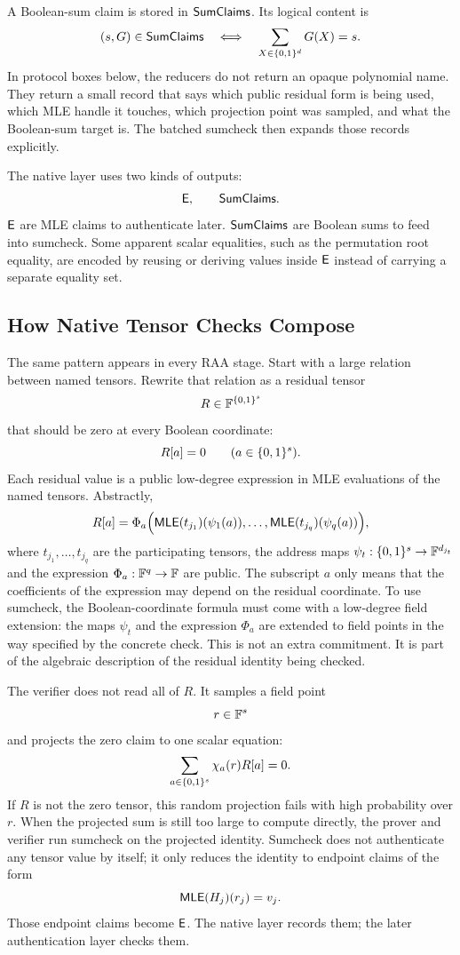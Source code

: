 A Boolean-sum claim is stored in \(\mathsf{SumClaims}\).  Its logical content is
\[
  (s,G)\in\mathsf{SumClaims}
  \quad\Longleftrightarrow\quad
  \sum_{X\in\{0,1\}^d}G(X)=s.
\]
In protocol boxes below, the reducers do not return an opaque polynomial name.
They return a small record that says which public residual form is being used,
which MLE handle it touches, which projection point was sampled, and what the
Boolean-sum target is.  The batched sumcheck then expands those records
explicitly.

The native layer uses two kinds of outputs:
\[
  \mathsf{E},\qquad \mathsf{SumClaims}.
\]
\(\mathsf{E}\) are MLE claims to authenticate later.  \(\mathsf{SumClaims}\) are
Boolean sums to feed into sumcheck.  Some apparent scalar equalities, such as
the permutation root equality, are encoded by reusing or deriving values inside
\(\mathsf{E}\) instead of carrying a separate equality set.

\subsection{How Native Tensor Checks Compose}

The same pattern appears in every RAA stage.  Start with a large relation
between named tensors.  Rewrite that relation as a residual tensor
\[
  R\in\mathbb{F}^{\{0,1\}^s}
\]
that should be zero at every Boolean coordinate:
\[
  R[a]=0
  \qquad(a\in\{0,1\}^s).
\]
Each residual value is a public low-degree expression in MLE evaluations of the
named tensors.  Abstractly,
\[
  R[a]
  =
  \Phi_a\Bigl(
    \mathsf{MLE}(t_{j_1})(\psi_1(a)),
    \ldots,
    \mathsf{MLE}(t_{j_q})(\psi_q(a))
  \Bigr),
\]
where \(t_{j_1},\ldots,t_{j_q}\) are the participating tensors, the address
maps \(\psi_t:\{0,1\}^s\to\mathbb{F}^{d_{j_t}}\) and the expression \(\Phi_a:\mathbb{F}^q\to\mathbb{F}\)
are public.  The subscript \(a\) only means that the coefficients of the
expression may depend on the residual coordinate.
To use sumcheck, the Boolean-coordinate formula must come with a low-degree
field extension: the maps \(\psi_t\) and the expression \(\Phi_a\) are extended
to field points in the way specified by the concrete check.  This is not an
extra commitment.  It is part of the algebraic description of the residual
identity being checked.

The verifier does not read all of \(R\).  It samples a field point
\[
  r\in\mathbb{F}^s
\]
and projects the zero claim to one scalar equation:
\[
  \sum_{a\in\{0,1\}^s}\chi_a(r)R[a]=0.
\]
If \(R\) is not the zero tensor, this random projection fails with high
probability over \(r\).  When the projected sum is still too large to compute
directly, the prover and verifier run sumcheck on the projected identity.
Sumcheck does not authenticate any tensor value by itself; it only reduces the
identity to endpoint claims of the form
\[
  \mathsf{MLE}(H_j)(r_j)=v_j.
\]
Those endpoint claims become \(\mathsf{E}\).  The native layer records them; the
later authentication layer checks them.


